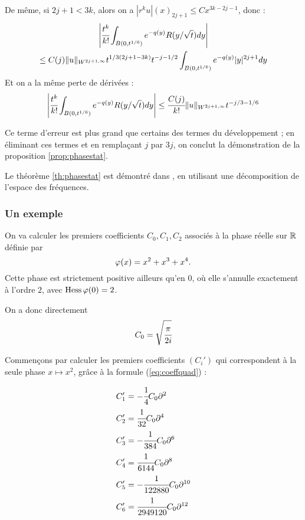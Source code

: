 \begin{preuve}
De même, si $2j+1 < 3k$, alors on a $|r^ku|(x)_{2j+1} \leq Cx^{3k-2j-1}$, donc :
\begin{multline*}
  \left|\cfrac{t^k}{k!}\int_{B(0,t^{1/6})}e^{-q(y)}R(y/\sqrt{t})dy\right| \\\leq C(j)\|u\|_{W^{2j+1,\infty}}t^{1/3(2j+1-3k)}t^{-j-1/2}\int_{B(0,t^{1/6})}e^{-q(y)}|y|^{2j+1}dy
\end{multline*}
\noindent Et on a la même perte de dérivées :
\begin{equation*}
  \left|\cfrac{t^k}{k!}\int_{B(0,t^{1/6})}e^{-q(y)}R(y/\sqrt{t})dy\right| \leq \cfrac{C(j)}{k!}\|u\|_{W^{2j+1,\infty}}t^{-j/3-1/6}
\end{equation*}

Ce terme d'erreur est plus grand que certains des termes du développement ; en éliminant ces termes et en remplaçant $j$ par $3j$, on conclut la démonstration de la proposition \ref{prop:phasestat}.
\end{preuve}

\begin{rem}
	Le théorème \ref{th:phasestat} est démontré dans \cite{hormander2003analysis}, en utilisant une décomposition de l'espace des fréquences.
\end{rem}

\subsubsection{Un exemple}
On va calculer les premiers coefficients $C_0, C_1, C_2$ associés à la phase réelle sur $\mathbb{R}$ définie par
\begin{equation*}
	\varphi(x)=x^2 + x^3 + x^4.
\end{equation*}
\noindent Cette phase est strictement positive ailleurs qu'en $0$, où elle s'annulle exactement à l'ordre $2$, avec $\operatorname{Hess} \varphi(0)=2$.

On a donc directement
\begin{equation*}
	C_0 = \sqrt{\cfrac{\pi}{2i}}
\end{equation*}

Commençons par calculer les premiers coefficients $(C_i')$ qui correspondent à la seule phase $x \mapsto x^2$, grâce à la formule (\ref{eq:coeffquad}) : 

\begin{align*}
	C_1' &= -\cfrac{1}{4}C_0\partial^2\\
	C_2' &= \cfrac{1}{32}C_0\partial^4\\
	C_3' &= -\cfrac{1}{384}C_0\partial^6\\
	C_4' &= \cfrac{1}{6144}C_0\partial^8\\
	C_5' &= -\cfrac{1}{122880}C_0\partial^{10}\\
	C_6' &= \cfrac{1}{2949120}C_0\partial^{12}
\end{align*}

